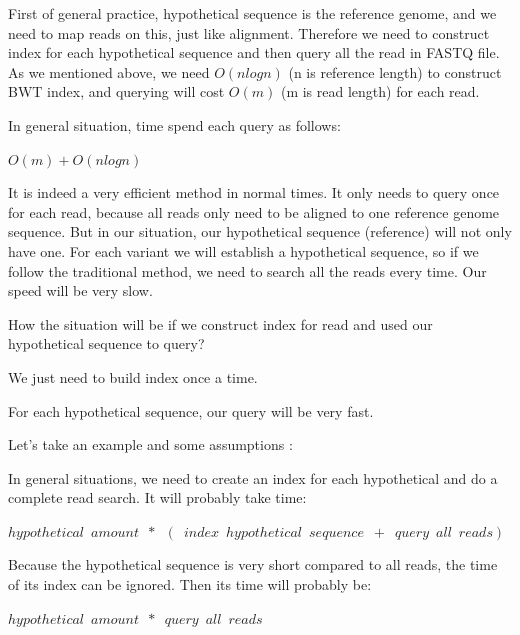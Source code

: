 First of general practice, hypothetical sequence is the reference genome, and we need to map reads on this, just like alignment. Therefore we need to construct index for each hypothetical sequence and then query all the read in FASTQ file. As we mentioned above, we  need $O(nlogn)$  (n is reference length) to construct BWT index, and querying will cost $O(m)$ (m is read length) for each read.
\begin{flushleft}
In general situation, time spend each query as follows: 
\end{flushleft} 
\begin{center}
    $O(m)+O(nlogn)$
\end{center}  

It is indeed a very efficient method in normal times. It only needs to query once for each read, because all reads only need to be aligned to one reference genome sequence. But in our situation, our hypothetical sequence (reference) will not only have one. For each variant we will establish a hypothetical sequence, so if we follow the traditional method, we need to search all the reads every time. Our speed will be very slow.

How the situation will be if we construct index for read and used our hypothetical sequence to query?
\begin{enumerate}
{
    \item We just need to build index once a time.
    \item For each hypothetical sequence, our query will be very fast.
}
\end{enumerate}

\begin{flushleft}
Let's take an example and some assumptions :
\end{flushleft}

In general situations, we need to create an index for each hypothetical and do a complete read search. It will probably take time:
\begin{center}
    $hypothetical\enspace amount\enspace*\enspace(\enspace index\enspace hypothetical\enspace sequence\enspace+\enspace query\enspace all\enspace reads)$
\end{center}  
\begin{flushleft}
Because the hypothetical sequence is very short compared to all reads, the time of its index can be ignored. Then its time will probably be:
\end{flushleft}
\begin{center}
    $hypothetical\enspace amount\enspace*\enspace query\enspace all\enspace reads$
\end{center}  


